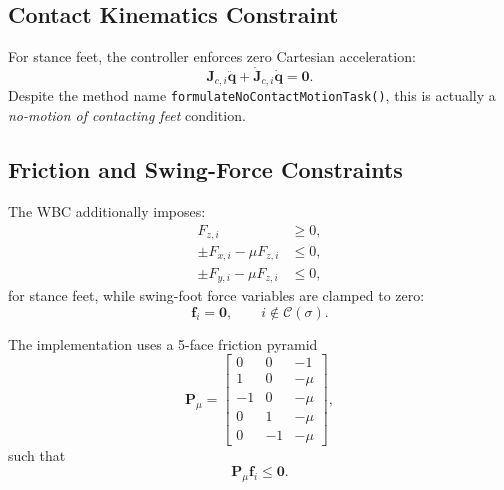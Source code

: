\documentclass[11pt,a4paper]{article}
\newcommand{\vect}[1]{\bm{#1}}
\newcommand{\mat}[1]{\bm{#1}}
\newcommand{\code}[1]{\texttt{#1}}
\begin{document}
\subsection{Contact Kinematics Constraint}
For stance feet, the controller enforces zero Cartesian acceleration:
\begin{equation}
\mat{J}_{c,i}\ddot{\vect{q}} + \dot{\mat{J}}_{c,i}\dot{\vect{q}} = \vect{0}.
\end{equation}
Despite the method name \code{formulateNoContactMotionTask()}, this is actually a \emph{no-motion of contacting feet} condition.

\subsection{Friction and Swing-Force Constraints}
The WBC additionally imposes:
\begin{align}
F_{z,i} &\ge 0, \\
\pm F_{x,i} - \mu F_{z,i} &\le 0, \\
\pm F_{y,i} - \mu F_{z,i} &\le 0,
\end{align}
for stance feet, while swing-foot force variables are clamped to zero:
\begin{equation}
\vect{f}_{i} = \vect{0}, \qquad i \notin \mathcal{C}(\sigma).
\end{equation}

The implementation uses a 5-face friction pyramid
\begin{equation}
\mat{P}_{\mu} =
\begin{bmatrix}
0 & 0 & -1 \\
1 & 0 & -\mu \\
-1 & 0 & -\mu \\
0 & 1 & -\mu \\
0 & -1 & -\mu
\end{bmatrix},
\end{equation}
such that
\begin{equation}
\mat{P}_{\mu}\vect{f}_i \le \vect{0}.
\end{equation}
\end{document}
